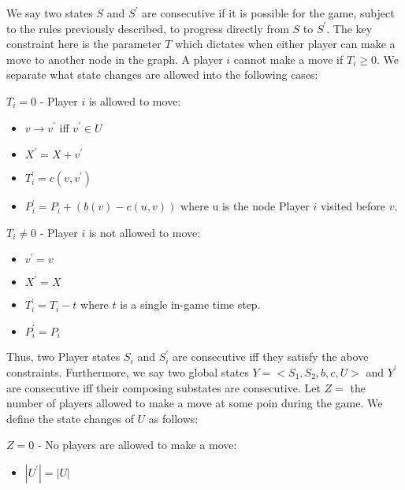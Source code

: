 \documentclass[12pt]{article}%
\begin{document}
	We say two states $S$ and $S^{\prime}$ are consecutive if it is possible for the game, subject to the rules previously described, to progress directly from $S$ to $S^{\prime}$. The key constraint here is the parameter $T$ which dictates when either player can make a move to another node in the graph. A player $i$ cannot make a move if $T_{i} \geq 0$. We separate what state changes are allowed into the following cases:\newline
	
	$T_i = 0$ - Player $i$ is allowed to move:\newline
	
	\begin{itemize}
		\item $v \rightarrow v^{\prime}$ iff $v^{\prime} \in U$
		\item $X^{\prime} = X + v^{\prime}$
		\item $T_{i}^{\prime} = c(v, v^{\prime})$
		\item $P_{i}^{\prime} = P_i + (b(v) - c(u,v))$ where u is the node Player $i$ visited before $v$.\newline
	\end{itemize}

	$T_i \neq 0$ - Player $i$ is not allowed to move:\newline
	
	\begin{itemize}
		\item $v^{\prime} = v$
		\item $X^{\prime} = X$
		\item $T_{i}^{\prime} = T_i - t$ where $t$ is a single in-game time step.
		\item $P_{i}^{\prime} = P_i$
	\end{itemize}

	Thus, two Player states $S_i$ and $S_i^{\prime}$ are consecutive iff they satisfy the above constraints. Furthermore, we say two global states $Y = <S_1, S_2, b, c, U>$ and $Y^{\prime}$ are consecutive iff their composing substates are consecutive. Let $Z = $ the number of players allowed to make a move at some poin during the game. We define the state changes of $U$ as follows:\newline
	
	$Z = 0$ - No players are allowed to make a move:\newline
	
	\begin{itemize}
		\item $| U^{\prime} | = | U |$\newline
	\end{itemize}
\end{document}
